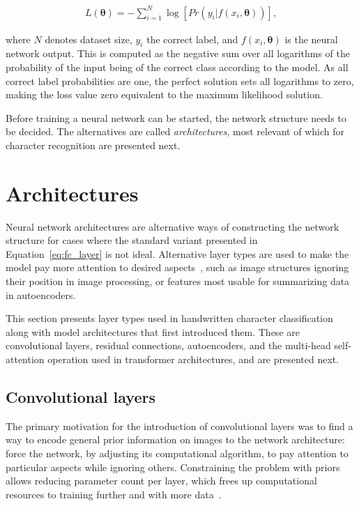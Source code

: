 \documentclass[english,twoside,openright]{UH_DS_MSc}
\begin{document}
\begin{align}
    L(\mathbf{\theta})=-\sum_{i=1}^{N}\log[Pr(y_i|f(x_i,\mathbf{\theta}))],
\end{align}

where $N$ denotes dataset size, $y_i$ the correct label, and $f(x_i, \mathbf{\theta})$ is the neural network output. This is computed as the negative sum over all logarithms of the probability of the input being of the correct class according to the model. As all correct label probabilities are one, the perfect solution sets all logarithms to zero, making the loss value zero equivalent to the maximum likelihood solution.

Before training a neural network can be started, the network structure needs to be decided. The alternatives are called \textit{architectures}, most relevant of which for character recognition are presented next.

\section{Architectures}

Neural network architectures are alternative ways of constructing the network structure for cases where the standard variant presented in Equation~\ref{eq:fc_layer} is not ideal. Alternative layer types are used to make the model pay more attention to desired 
aspects~\cite{alexnet}, such as image structures ignoring their position in image processing, or features most usable for summarizing data in autoencoders.

This section presents layer types used in handwritten character classification 
along with model architectures that first introduced them.
These are convolutional layers, residual connections, autoencoders, and the multi-head self-attention operation used in transformer architectures, and are presented next.

\subsection{Convolutional layers}

The primary motivation for the introduction of convolutional layers was to find a way to encode general prior information 
on images to the network architecture: force the network, by adjusting its computational 
algorithm, to pay attention to particular aspects while ignoring others. Constraining the problem with priors allows reducing parameter count per layer, which frees up 
computational resources to training further and with more data~\cite{alexnet}.
\end{document}
